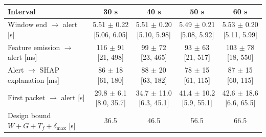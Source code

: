 \begin{tabular}{lcccc}
\toprule
\textbf{Interval} & \textbf{30 s} & \textbf{40 s} & \textbf{50 s} & \textbf{60 s} \\
\midrule
Window end $\rightarrow$ alert [s] & 5.51 $\pm$ 0.22 [5.06, 6.05] & 5.51 $\pm$ 0.20 [5.10, 5.98] & 5.49 $\pm$ 0.21 [5.08, 5.92] & 5.53 $\pm$ 0.20 [5.11, 5.99] \\
Feature emission $\rightarrow$ alert [ms] & 116 $\pm$ 91 [21, 498] & 99 $\pm$ 72 [23, 465] & 93 $\pm$ 63 [21, 517] & 103 $\pm$ 78 [18, 550] \\
Alert $\rightarrow$ SHAP explanation [ms] & 86 $\pm$ 18 [61, 180] & 88 $\pm$ 20 [63, 182] & 78 $\pm$ 15 [61, 115] & 87 $\pm$ 15 [60, 115] \\
First packet $\rightarrow$ alert [s] & 29.8 $\pm$ 6.1 [8.0, 35.7] & 34.7 $\pm$ 11.0 [6.3, 45.1] & 41.4 $\pm$ 10.2 [5.9, 55.1] & 42.6 $\pm$ 18.6 [6.6, 65.5] \\
Design bound $W+G+T_f+\delta_{\max}$ [s] & 36.5 & 46.5 & 56.5 & 66.5 \\
\bottomrule
\end{tabular}
